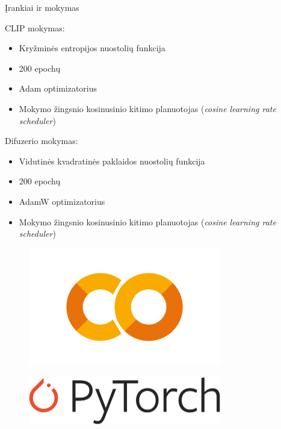 \begin{frame}[c]{Įrankiai ir mokymas}
    \begin{minipage}[t]{0.65\textwidth}
        CLIP mokymas:
        \begin{itemize}
            \item Kryžminės entropijos nuostolių funkcija
            \item 200 epochų
            \item Adam optimizatorius
            \item Mokymo žingsnio kosinusinio
kitimo planuotojas (\textit{cosine learning rate scheduler})
        \end{itemize}
        Difuzerio mokymas:
        \begin{itemize}
            \item Vidutinės
kvadratinės paklaidos nuostolių funkcija
            \item 200 epochų
            \item AdamW optimizatorius
            \item Mokymo žingsnio kosinusinio
kitimo planuotojas (\textit{cosine learning rate scheduler})
        \end{itemize}
    \end{minipage}
    \begin{minipage}[t]{0.29\textwidth}
        \begin{figure}
            \centering
            \includegraphics[width=0.75\textwidth]{img/Google_Colaboratory_SVG_Logo.svg.png}
        \end{figure}
        \begin{figure}
            \centering
            \includegraphics[width=0.75\textwidth]{img/Pytorch_logo.png}

\end{figure}
\end{minipage}
\end{frame}
